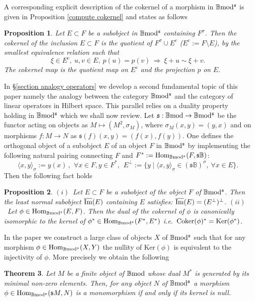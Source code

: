 \documentclass[12pt]{article}
\newtheorem{thm}{Theorem}[section]
\newtheorem{prop}[thm]{Proposition}
\def\Hom{{\rm Hom}}
\def\Ker{{\rm Ker}}
\def\coker{{\rm Coker}}
\def\B{{\mathbb B}}
\def\imm{\overline{\rm Im}}
\def\qqq{\,,\,~\forall}
\newcommand{\ie}{{\it i.e.\/}\ }
\def\ker{{\mbox{Ker}}}
\def\Hom {{\mbox{Hom}}}
\def\yb{\mathfrak{s}}
\def\bmod{{\rm \B mod}}
\def\b2{{\rm \B mod^{\mathfrak s}}}
\begin{document}
  A corresponding explicit description of the cokernel of a morphism in $\b2$ is given in Proposition \ref{compute cokernel} and states as follows
  \begin{prop}\label{compute cokernel intro} Let $E\subset F$ be a subobject in $\b2$ containing $F^\sigma$. Then the cokernel of the inclusion $E\subset F$ is the quotient of $F^\sigma\cup E^c$ ($E^c:=F\setminus E$), by the smallest equivalence relation such that 
   \begin{equation}\label{simple add kernel intro}
   \xi \in E^c,\ u,v\in E,\ p(u)=p(v)~\Longrightarrow~ \xi +u\sim \xi +v.
  \end{equation} 
   The cokernel map is the quotient map on $E^c$ and the projection $p$ on $E$. 
   \end{prop}


In \S\ref{section analogy operators} we develop a second fundamental topic of this paper namely the analogy between the category $\b2$ and the category of linear operators in Hilbert space. This parallel relies on a duality property  holding in $\b2$ which we shall now review. Let $\yb: \bmod \to \b2$ be the functor acting on objects as $M \mapsto (M^2,\sigma_M)$, where $\sigma_M(x,y) = (y,x)$ and on morphisms $f:M\to N$ as $\yb(f)(x,y)=(f(x),f(y))$. One defines the orthogonal object of a subobject $E$ of an object $F$ in $\b2$ by implementing the following natural pairing connecting $F$ and $F^*:=\Hom_\b2(F,\yb\B)$: 
\[
\langle x,y\rangle_\sigma:=y(x)\qqq x\in F,y\in F^*, \ \ E^\perp:=\{y\mid  \langle x,y\rangle_\sigma \in (\yb\B)^\sigma,~\forall x\in E\}.
\] 
Then the following fact holds 
\begin{prop}\label{bidualcoker intro} $(i)$~Let $E\subset F$ be a subobject of the object $F$ of $\b2$. Then the least normal subobject $\imm(E)$ containing $E$ satisfies: $\imm(E)=(E^\perp)^\perp$.\newline
$(ii)$~Let $\phi\in \Hom_\b2(E,F)$. Then the dual of the cokernel of $\phi$ is canonically isomorphic to the kernel of $\phi^*\in \Hom_\b2(F^*,E^*)$ \ie  $\coker(\phi)^*=\Ker(\phi^*)$.
 \end{prop}
 In the paper we construct a large class of objects $X$ of $\b2$ such that for any morphism $\phi\in \Hom_\b2(X,Y)$ the nullity of $\ker(\phi)$ is equivalent to the injectivity of $\phi$. More precisely we obtain the following
\begin{thm}\label{null kernel thm intro} Let $M$ be a finite object of $\bmod$ whose dual $M^*$ is generated by its minimal non-zero elements. Then, for any object $N$ of $\b2$ a morphism $\phi\in \Hom_\b2(\yb M,N)$ is a monomorphism if and only if its kernel is null.	
\end{thm}
\end{document}
